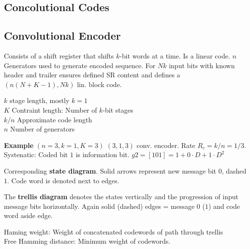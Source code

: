 \documentclass[a4paper, fontsize=8pt, landscape, DIV=1]{scrartcl}
\begin{document}
\begin{multicols*}{4}
  \section{Concolutional Codes}
  \subsection{Convolutional Encoder}
  Consists of a shift register that shifts $k$-bit words at a time. Is a linear
  code. $n$ Generators used to generate encoded sequence. For $Nk$ input bits
  with known header and trailer ensures defined SR content and defines a
  $(n(N+K-1), Nk)$ lin. block code.
  
  $k$ stage length, mostly $k=1$ \\
  $K$ Contraint length: Number of $k$-bit stages \\
  $k/n$ Approximate code length \\
  $n$ Number of generators

  \textbf{Example} $(n=3,k=1,K=3)$ $(3,1,3)$ conv. encoder. Rate $R_c=k/n=1/3$. Systenatic: 
  Coded bit $1$ is information bit. $g2=[1 0 1]=1+0\cdot D+1\cdot D^2$

  Corresponding \textbf{state diagram}. Solid arrows represent new message bit $0$, 
  dashed $1$. Code word is denoted next to edges.

  The \textbf{trellis diagram} denotes the states vertically and the progression of
  input message bits horizontally. Again solid (dashed) edges = message $0$ ($1$)
  and code word aside edge.

  Haming weight: Weight of concatenated codewords of path through trellis\\
  Free Hamming distance: Minimum weight of codewords.


\end{multicols*}
\end{document}
